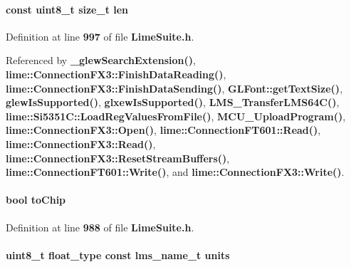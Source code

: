 \paragraph[{len}]{\setlength{\rightskip}{0pt plus 5cm}const uint8\+\_\+t size\+\_\+t len}\label{group__FN__LOW__LVL_gab8d2afc6ea251b08f3a2774565c57d5b}


Definition at line {\bf 997} of file {\bf Lime\+Suite.\+h}.



Referenced by {\bf \+\_\+glew\+Search\+Extension()}, {\bf lime\+::\+Connection\+F\+X3\+::\+Finish\+Data\+Reading()}, {\bf lime\+::\+Connection\+F\+X3\+::\+Finish\+Data\+Sending()}, {\bf G\+L\+Font\+::get\+Text\+Size()}, {\bf glew\+Is\+Supported()}, {\bf glxew\+Is\+Supported()}, {\bf L\+M\+S\+\_\+\+Transfer\+L\+M\+S64\+C()}, {\bf lime\+::\+Si5351\+C\+::\+Load\+Reg\+Values\+From\+File()}, {\bf M\+C\+U\+\_\+\+Upload\+Program()}, {\bf lime\+::\+Connection\+F\+X3\+::\+Open()}, {\bf lime\+::\+Connection\+F\+T601\+::\+Read()}, {\bf lime\+::\+Connection\+F\+X3\+::\+Read()}, {\bf lime\+::\+Connection\+F\+X3\+::\+Reset\+Stream\+Buffers()}, {\bf lime\+::\+Connection\+F\+T601\+::\+Write()}, and {\bf lime\+::\+Connection\+F\+X3\+::\+Write()}.

\paragraph[{to\+Chip}]{\setlength{\rightskip}{0pt plus 5cm}bool to\+Chip}\label{group__FN__LOW__LVL_gac0d1eb9430e79d6b54910de95b9be2d0}


Definition at line {\bf 988} of file {\bf Lime\+Suite.\+h}.

\paragraph[{units}]{\setlength{\rightskip}{0pt plus 5cm}uint8\+\_\+t {\bf float\+\_\+type} const {\bf lms\+\_\+name\+\_\+t} units}\label{group__FN__LOW__LVL_ga0e16e28feec832005ce31f9f2671d161}


